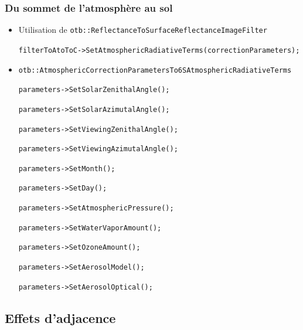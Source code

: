\documentclass[compress]{beamer}
\begin{document}
\begin{frame}

  \frametitle{Du sommet de l'atmosphère au sol}
  \begin{itemize}
  \tiny
  \item Utilisation de \texttt{otb::ReflectanceToSurfaceReflectanceImageFilter}

  \texttt{filterToAtoToC->SetAtmosphericRadiativeTerms(correctionParameters);}

  \item \texttt{otb::AtmosphericCorrectionParametersTo6SAtmosphericRadiativeTerms} 

\texttt{parameters->SetSolarZenithalAngle();}

\texttt{parameters->SetSolarAzimutalAngle();}

\texttt{parameters->SetViewingZenithalAngle();}

\texttt{parameters->SetViewingAzimutalAngle();}

\texttt{parameters->SetMonth();}

\texttt{parameters->SetDay();}

\texttt{parameters->SetAtmosphericPressure();}

\texttt{parameters->SetWaterVaporAmount();}

\texttt{parameters->SetOzoneAmount();}

\texttt{parameters->SetAerosolModel();}

\texttt{parameters->SetAerosolOptical();}
\end{itemize}
\end{frame}


\subsection[Adjacence]{Effets d'adjacence}
\end{document}
